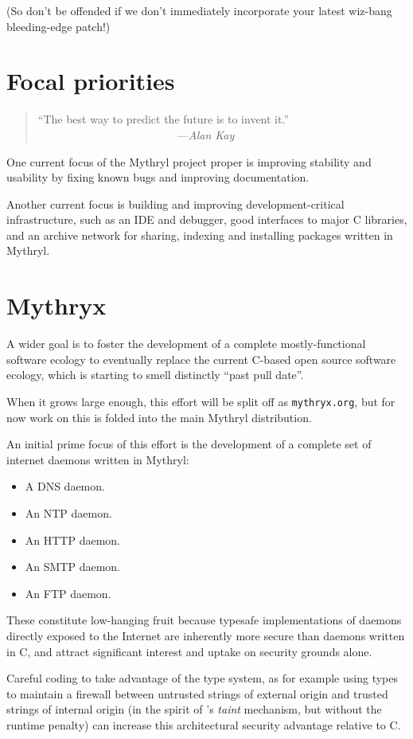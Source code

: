 (So don't be offended if we don't immediately incorporate your latest 
wiz-bang bleeding-edge patch!)

\section{Focal priorities}

\begin{quote}\begin{tiny}
        ``The best way to predict the future is to invent it.''\newline
            ~~~~~~~~~~~~~~~~~~~~~~~~~---{\em Alan Kay}
\end{tiny}\end{quote}


One current focus of the Mythryl project proper 
is improving stability and 
usability by fixing known bugs and improving documentation.

Another current focus is building and improving development-critical 
infrastructure, such as an {\sc IDE} and debugger, 
good interfaces to major C libraries, and an archive network for 
sharing, indexing and installing packages written in Mythryl.

\section{Mythryx}

A wider goal is to foster the development of a complete mostly-functional 
software ecology to eventually replace the current C-based open source 
software ecology, which is starting to smell distinctly ``past pull date''.

When it grows large enough, this effort will be split off as 
{\tt mythryx.org}, but for now work on this is folded into 
the main Mythryl distribution.

An initial prime focus of this effort is the development of 
a complete set of internet daemons written in Mythryl:

\begin{itemize}
\item A {\sc DNS} daemon.
\item An {\sc NTP} daemon.
\item An {\sc HTTP} daemon.
\item An {\sc SMTP} daemon.
\item An {\sc FTP} daemon.
\end{itemize}

These constitute low-hanging fruit because typesafe implementations 
of daemons directly exposed to the Internet are inherently more secure 
than daemons written in C, and attract significant interest and 
uptake on security grounds alone.

Careful coding to take advantage of the type system, as for example 
using types to maintain a firewall between untrusted strings of external 
origin and trusted strings of internal origin (in the spirit of 
's {\em taint} mechanism, but without the 
runtime penalty) can increase this architectural security advantage 
relative to C.
